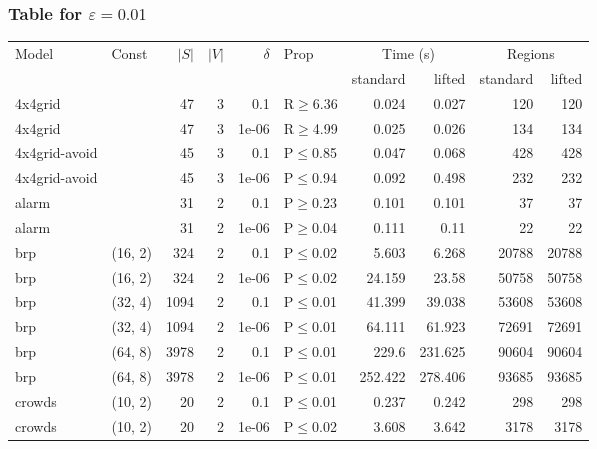 \subsubsection{Table for \(\varepsilon=0.01\)}
\begin{longtable}{llrrrlrrrr}

        \toprule
        Model & Const & $|S|$ & $|V|$ & $\delta$ & Prop & \multicolumn{2}{c}{Time (s)} & \multicolumn{2}{c}{Regions} \\
        \cmidrule(ll){7-8} \cmidrule(ll){9-10}
        & & & & & & standard & lifted & standard & lifted \\
        \midrule
        
 4x4grid       &           &     	47 &   3 & 0.1   & R$\geq$6.36  & 0.024   & 0.027   & 120   & 120   \\
 4x4grid       &           &     	47 &   3 & 1e-06 & R$\geq$4.99  & 0.025   & 0.026   & 134   & 134   \\
 4x4grid-avoid &           &     	45 &   3 & 0.1   & P$\leq$0.85  & 0.047   & 0.068   & 428   & 428   \\
 4x4grid-avoid &           &     	45 &   3 & 1e-06 & P$\leq$0.94  & 0.092   & 0.498   & 232   & 232   \\
 alarm         &           &     	31 &   2 & 0.1   & P$\geq$0.23  & 0.101   & 0.101   & 37    & 37    \\
 alarm         &           &     	31 &   2 & 1e-06 & P$\geq$0.04  & 0.111   & 0.11    & 22    & 22    \\
 brp           & (16, 2)   &    	324 &   2 & 0.1   & P$\leq$0.02  & 5.603   & 6.268   & 20788 & 20788 \\
 brp           & (16, 2)   &    	324 &   2 & 1e-06 & P$\leq$0.02  & 24.159  & 23.58   & 50758 & 50758 \\
 brp           & (32, 4)   &   	1094 &   2 & 0.1   & P$\leq$0.01  & 41.399  & 39.038  & 53608 & 53608 \\
 brp           & (32, 4)   &   	1094 &   2 & 1e-06 & P$\leq$0.01  & 64.111  & 61.923  & 72691 & 72691 \\
 brp           & (64, 8)   &   	3978 &   2 & 0.1   & P$\leq$0.01  & 229.6   & 231.625 & 90604 & 90604 \\
 brp           & (64, 8)   &   	3978 &   2 & 1e-06 & P$\leq$0.01  & 252.422 & 278.406 & 93685 & 93685 \\
 crowds        & (10, 2)   &     	20 &   2 & 0.1   & P$\leq$0.01  & 0.237   & 0.242   & 298   & 298   \\
 crowds        & (10, 2)   &     	20 &   2 & 1e-06 & P$\leq$0.02  & 3.608   & 3.642   & 3178  & 3178  \\

\end{longtable}
